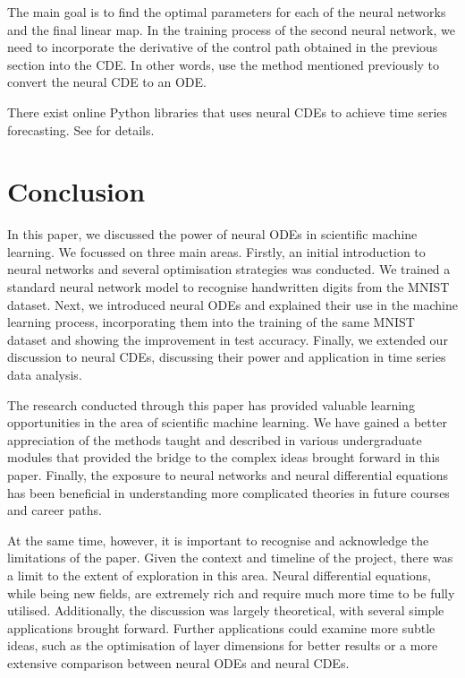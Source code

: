 \documentclass[a4paper,11pt,titlepage]{article}
\theoremstyle{definition}
\theoremstyle{plain}
\theoremstyle{remark}
\begin{document}
The main goal is to find the optimal parameters for each of the neural networks and the final linear map. In the training process of the second neural network, we need to incorporate the derivative of the control path obtained in the previous section into the CDE. In other words, use the method mentioned previously to convert the neural CDE to an ODE.

There exist online Python libraries that uses neural CDEs to achieve time series forecasting. See \cite{Jhin2023} for details.

\pagebreak
\section{Conclusion}

In this paper, we discussed the power of neural ODEs in scientific machine learning. We focussed on three main areas. Firstly, an initial introduction to neural networks and several optimisation strategies was conducted. We trained a standard neural network model to recognise handwritten digits from the MNIST dataset. Next, we introduced neural ODEs and explained their use in the machine learning process, incorporating them into the training of the same MNIST dataset and showing the improvement in test accuracy. Finally, we extended our discussion to neural CDEs, discussing their power and application in time series data analysis.

The research conducted through this paper has provided valuable learning opportunities in the area of scientific machine learning. We have gained a better appreciation of the methods taught and described in various undergraduate modules that provided the bridge to the complex ideas brought forward in this paper. Finally, the exposure to neural networks and neural differential equations has been beneficial in understanding more complicated theories in future courses and career paths.

At the same time, however, it is important to recognise and acknowledge the limitations of the paper. Given the context and timeline of the project, there was a limit to the extent of exploration in this area. Neural differential equations, while being new fields, are extremely rich and require much more time to be fully utilised. Additionally, the discussion was largely theoretical, with several simple applications brought forward. Further applications could examine more subtle ideas, such as the optimisation of layer dimensions for better results or a more extensive comparison between neural ODEs and neural CDEs.
\end{document}
